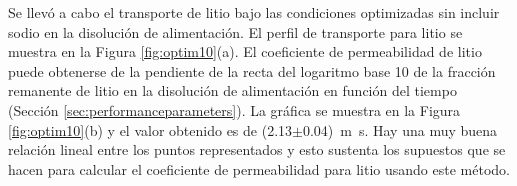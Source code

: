 
Se llevó a cabo el transporte de litio bajo las condiciones optimizadas sin incluir sodio en la di\-so\-lu\-ción de alimentación. El perfil de transporte para litio se muestra en la Figura \ref{fig:optim10}(a). El coeficiente de permeabilidad de litio puede obtenerse de la pendiente de la recta del logaritmo base 10 de la fracción remanente de litio en la disolución de alimentación en función del tiempo (Sección \ref{sec:performanceparameters}). La gráfica se muestra en la  Figura \ref{fig:optim10}(b) y el valor obtenido es de (2.13$\pm$0.04)~m~s\mnn. Hay una muy buena relación lineal entre los puntos representados y esto sustenta los supuestos que se hacen para calcular el coeficiente de permeabilidad para litio usando este método.

